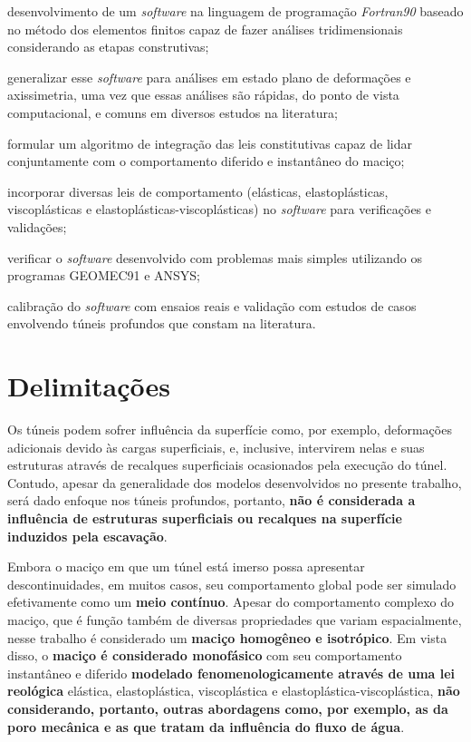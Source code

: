 \begin{alineas}
	
	\item desenvolvimento de um \textit{software} na linguagem de programação \textit{Fortran90} baseado no método dos elementos finitos capaz de fazer análises tridimensionais considerando as etapas construtivas; 
	
	\item generalizar esse \textit{software} para análises em estado plano de deformações e axissimetria, uma vez que essas análises são rápidas, do ponto de vista computacional, e comuns em diversos estudos na literatura;
	
	\item formular um algoritmo de integração das leis constitutivas capaz de lidar conjuntamente com o comportamento diferido e instantâneo do maciço;
	
	\item incorporar diversas leis de comportamento (elásticas, elastoplásticas, viscoplásticas e elastoplásticas-viscoplásticas) no \textit{software} para verificações e validações;
	
	\item verificar o \textit{software} desenvolvido com problemas mais simples utilizando os programas GEOMEC91 e ANSYS;
	
	\item calibração do \textit{software} com ensaios reais e validação com estudos de casos envolvendo túneis profundos que constam na literatura.
	
\end{alineas}

\section{Delimitações}
Os túneis podem sofrer influência da superfície como, por exemplo, deformações adicionais devido às cargas superficiais, e, inclusive, intervirem nelas e suas estruturas através de recalques superficiais ocasionados pela execução do túnel. Contudo, apesar da generalidade dos modelos desenvolvidos no presente trabalho, será dado enfoque nos túneis profundos, portanto, \textbf{não é considerada a influência de estruturas superficiais ou recalques na superfície induzidos pela escavação}.

Embora o maciço em que um túnel está imerso possa apresentar descontinuidades, em muitos casos, seu comportamento global pode ser simulado efetivamente como um \textbf{meio contínuo}. Apesar do comportamento complexo do maciço, que é função também de diversas propriedades que variam espacialmente, nesse trabalho é considerado um \textbf{maciço homogêneo e isotrópico}. Em vista disso, o \textbf{maciço é considerado monofásico} com seu comportamento instantâneo e diferido \textbf{modelado fenomenologicamente através de uma lei reológica} elástica, elastoplástica, viscoplástica e elastoplástica-viscoplástica, \textbf{não considerando, portanto, outras abordagens como, por exemplo, as da poro mecânica e as que tratam da influência do fluxo de água}.

